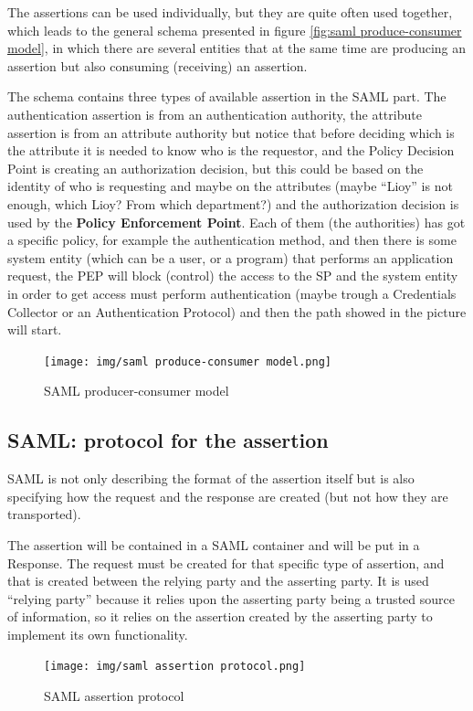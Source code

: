 The assertions can be used individually, but they are quite often used
together, which leads to the general schema presented in figure
\ref{fig:saml produce-consumer model}, in which there are several
entities that at the same time are producing an assertion but also
consuming (receiving) an assertion. 

The schema contains three types of available assertion in the SAML
part. The authentication assertion is from an authentication
authority, the attribute assertion is from an attribute authority but
notice that before deciding which is the attribute it is needed to
know who is the requestor, and the Policy Decision Point is creating
an authorization decision, but this could be based on the identity of
who is requesting and maybe on the attributes (maybe “Lioy” is not
enough, which Lioy? From which department?) and the authorization
decision is used by the \textbf{Policy Enforcement Point}. Each of them (the
authorities) has got a specific policy, for example the
authentication method, and then there is some system entity (which can
be a user, or a program) that performs an application request, the PEP
will block (control) the access to the SP and the system entity in
order to get access must perform authentication (maybe trough a
Credentials Collector or an Authentication Protocol) and then the path
showed in the picture will start.
\begin{figure}[H]
  \centering
  \texttt{[image: img/saml produce-consumer
  model.png]}
  \label{fig:saml-producer-consumer-model}
  \caption{SAML producer-consumer model}
\end{figure}

\subsection{SAML: protocol for the assertion}
SAML is not only describing the format of the assertion itself but is
also specifying how the request and the response are created (but not
how they are transported).

The assertion will be contained in a SAML container and will be put in
a Response. The request must be created for that specific type of
assertion, and that is created between the relying party and the
asserting party. It is used “relying party” because it relies upon the
asserting party being a trusted source of information, so it relies on
the assertion created by the asserting party to implement its own
functionality.

\begin{figure}[H]
  \centering
  \texttt{[image: img/saml assertion
  protocol.png]}
  \caption{SAML assertion protocol}
\end{figure}

